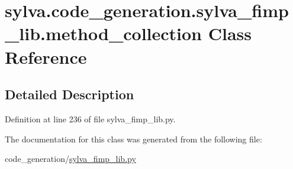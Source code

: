 \hypertarget{classsylva_1_1code__generation_1_1sylva__fimp__lib_1_1method__collection}{}\section{sylva.\+code\+\_\+generation.\+sylva\+\_\+fimp\+\_\+lib.\+method\+\_\+collection Class Reference}
\label{classsylva_1_1code__generation_1_1sylva__fimp__lib_1_1method__collection}


\subsection{Detailed Description}


Definition at line 236 of file sylva\+\_\+fimp\+\_\+lib.\+py.



The documentation for this class was generated from the following file\+:\begin{DoxyCompactItemize}
\item 
code\+\_\+generation/\hyperlink{sylva__fimp__lib_8py}{sylva\+\_\+fimp\+\_\+lib.\+py}\end{DoxyCompactItemize}
